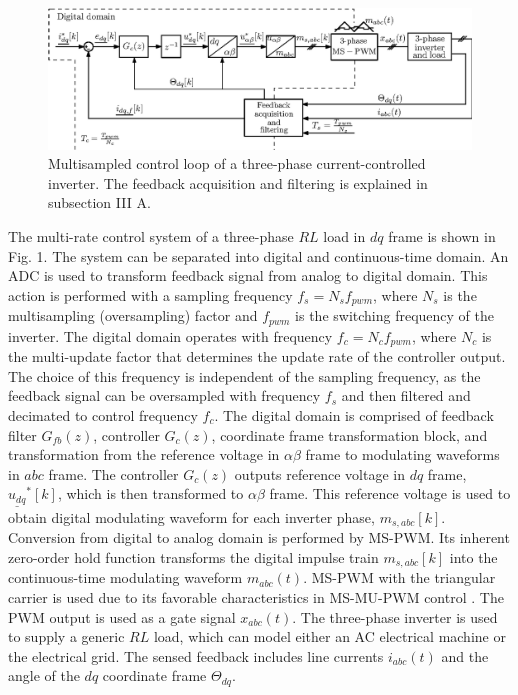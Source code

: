 \documentclass[conference]{IEEEtran}
\begin{document}
\begin{figure}[t!]
    \centerline{\includegraphics[width=0.8\linewidth]{figures/schematic.eps}}
    \caption{Multisampled control loop of a three-phase current-controlled inverter. The feedback acquisition and filtering is explained in subsection III A.}
    \label{fig:MSControl}
\end{figure}

The multi-rate control system of a three-phase $RL$ load in $dq$ frame is shown in Fig. 1. The system can be separated into digital and continuous-time domain. An ADC is used to transform feedback signal from analog to digital domain. This action is performed with a sampling frequency $f_s = N_s f_{pwm}$, where $N_s$ is the multisampling (oversampling) factor and $f_{pwm}$ is the switching frequency of the inverter. The digital domain operates with frequency $f_c = N_c f_{pwm}$, where $N_c$ is the multi-update factor that determines the update rate of the controller output. The choice of this frequency is independent of the sampling frequency, as the feedback signal can be oversampled with frequency $f_s$ and then filtered and decimated to control frequency $f_c$. The digital domain is comprised of feedback filter $G_{fb}(z)$, controller $G_c(z)$, coordinate frame transformation block, and transformation from the reference voltage in $\alpha \beta$ frame to modulating waveforms in $abc$ frame. The controller $G_c(z)$ outputs reference voltage in $dq$ frame, $\underline{u_{dq}}^*[k]$, which is then transformed to $\alpha \beta$ frame. This reference voltage is used to obtain digital modulating waveform for each inverter phase, $m_{s,abc}[k]$. Conversion from digital to analog domain is performed by MS-PWM. Its inherent zero-order hold function transforms the digital impulse train $m_{s,abc}[k]$ into the continuous-time modulating waveform $m_{abc}(t)$. MS-PWM with the triangular carrier is used due to its favorable characteristics in MS-MU-PWM control \cite{corradini2018}. The PWM output is used as a gate signal $x_{abc}(t)$. The three-phase inverter is used to supply a generic $RL$ load, which can model either an AC electrical machine or the electrical grid. The sensed feedback includes line currents $i_{abc}(t)$ and the angle of the $dq$ coordinate frame $\Theta_{dq}$. 
\end{document}

